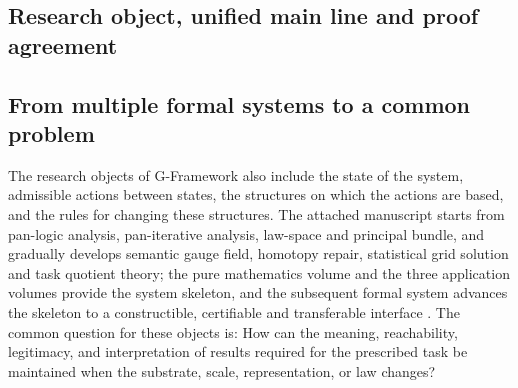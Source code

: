 \documentclass[11pt,a4paper]{article}
\theoremstyle{plain}
\theoremstyle{definition}
\theoremstyle{remark}
\begin{document}
\begin{CJK*}
\section { Research object, unified main line and proof agreement }\label{sec:introduction}


\subsection { From multiple formal systems to a common problem } The research objects of G-Framework also include the state of the system, admissible actions between states, the structures on which the actions are based, and the rules for changing these structures. The attached manuscript starts from pan-logic analysis, pan-iterative analysis, law-space and principal bundle, and gradually develops semantic gauge field, homotopy repair, statistical grid solution and task quotient theory; the pure mathematics volume and the three application volumes provide the system skeleton, and the subsequent formal system advances the skeleton to a constructible, certifiable and transferable interface \cite{S01,S02,S03,S04,S37,S38}. The common question for these objects is: How can the meaning, reachability, legitimacy, and interpretation of results required for the prescribed task be maintained when the substrate, scale, representation, or law changes?


\end{CJK*}
\end{document}
